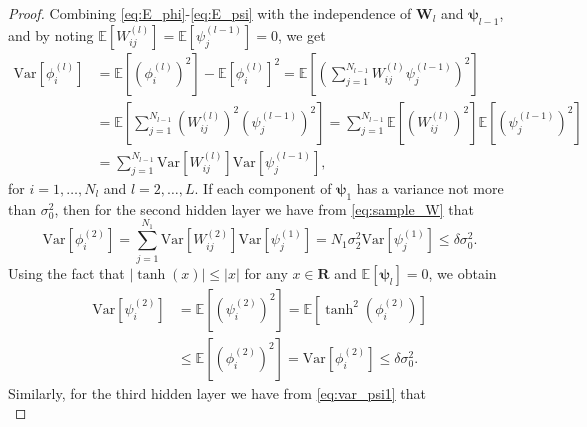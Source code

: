 \documentclass[10pt,a4paper]{amsart}
\newcommand{\bW}{\mathbf{W}}
\newcommand{\vpsi}{\boldsymbol{\psi}}
\begin{document}
\begin{proof}


Combining  \eqref{eq:E_phi}-\eqref{eq:E_psi} with the independence of $\bW_l$ and $\vpsi_{l-1}$, and by noting $\mathbb{E}\left[W_{ij}^{(l)}\right] = \mathbb{E}\left[\psi_{j}^{(l-1)}\right] = 0$,  we get 
\begin{equation}\label{eq:var_phi} 
   \begin{aligned}
       \mathrm{Var}\left[\phi_i^{(l)}\right] &= \mathbb{E}\left[\left(\phi_i^{(l)}\right)^2\right] - \mathbb{E}\left[\phi_i^{(l)}\right]^2 
       = \textstyle\mathbb{E}\left[\left(\sum\limits_{j=1}^{N_{l-1}} W_{ij}^{(l)}\psi_{j}^{(l-1)}\right)^2\right] \\
       &=\textstyle \mathbb{E}\left[\sum\limits_{j=1}^{N_{l-1}} \left(W_{ij}^{(l)}\right)^2 \left(\psi_{j}^{(l-1)}\right)^2\right] 
       = \textstyle\sum\limits_{j=1}^{N_{l-1}} \mathbb{E}\left[\left(W_{ij}^{(l)}\right)^2\right] \mathbb{E}\left[\left(\psi_{j}^{(l-1)}\right)^2\right]\\
       &= \sum_{j=1}^{N_{l-1}}\mathrm{Var}\left[W_{ij}^{(l)}\right]\mathrm{Var}\left[\psi_j^{(l-1)}\right],
   \end{aligned}
   \end{equation}
for  $i=1,\dots,N_l$ and $l=2,\dots,L$.
If each component of $\vpsi_1$ has a variance not more than $\sigma_0^2$, then for the second hidden layer we have from \eqref{eq:sample_W} that
\begin{equation}
\mathrm{Var}\left[\phi_i^{(2)}\right] 
= \textstyle\sum\limits_{j=1}^{N_1}\mathrm{Var}\left[W_{ij}^{(2)}\right]\mathrm{Var}\left[\psi_j^{(1)}\right]
= N_{1} \sigma_2^2 \mathrm{Var}\left[\psi_{j}^{(1)}\right]
        \leq \delta \sigma_0^2.
\end{equation}
Using the fact that $|\tanh(x)| \le |x|$ for any $x\in{\mathbf R}$ and $\mathbb{E}[\vpsi_l]=0$, we obtain 
\begin{equation}\label{eq:var_psi1}
\begin{aligned}
\mathrm{Var}\left[\psi_i^{(2)}\right]
&= \mathbb{E}\left[\left(\psi_i^{(2)}\right)^2\right]
= \mathbb{E}\left[\tanh^2\left(\phi_i^{(2)}\right)\right] \\
&\le \mathbb{E}\left[\left(\phi_i^{(2)}\right)^2\right]
= \mathrm{Var}\left[\phi_i^{(2)}\right] 
\leq \delta \sigma_0^2.
\end{aligned}
\end{equation}
Similarly, for the third hidden layer we have from 
\eqref{eq:var_psi1} that
\begin{equation}

\end{equation}
\end{proof}
\end{document}
